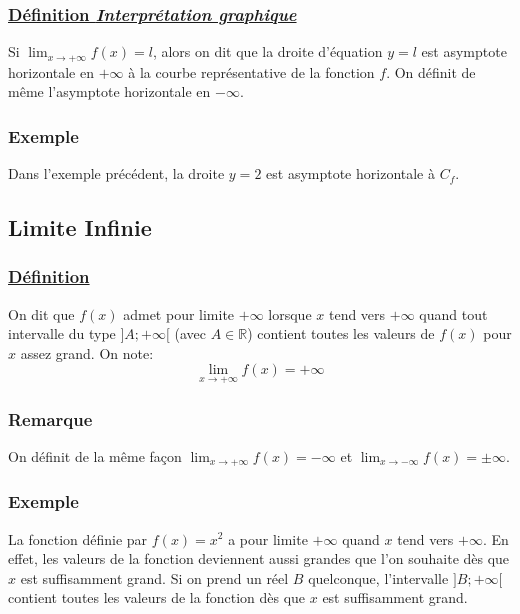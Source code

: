 \documentclass[9pt,twoside]{article}
\begin{document}
\subsubsection*{\underline{Définition \textit{Interprétation graphique}}}

Si $\lim_{x \to +\infty} f(x)=l$, alors on dit que la droite d'équation $y=l$ est asymptote horizontale en $+\infty$ à la courbe représentative de la fonction $f$. On définit de même l'asymptote horizontale en $-\infty$.

\subsubsection*{Exemple}

Dans l'exemple précédent, la droite $y=2$ est asymptote horizontale à $C_f$.

\subsection{Limite Infinie}

\subsubsection*{\underline{Définition}}

On dit que $f(x)$ admet pour limite $+\infty$ lorsque $x$ tend vers $+\infty$ quand tout intervalle du type $]A;+\infty[$ (avec $A \in \mathbb{R}$) contient toutes les valeurs de $f(x)$ pour $x$ assez grand. On note: $$\lim_{x \to +\infty} f(x) = +\infty$$

\subsubsection*{Remarque}

On définit de la même façon $\lim_{x \to +\infty}f(x)=-\infty$ et $\lim_{x \to -\infty}f(x)=\pm\infty$.

\subsubsection*{Exemple}

La fonction définie par $f(x)=x^2$ a pour limite $+\infty$ quand $x$ tend vers $+\infty$. En effet, les valeurs de la fonction deviennent aussi grandes que l'on souhaite dès que $x$ est suffisamment grand. Si on prend un réel $B$ quelconque, l'intervalle $]B;+\infty[$ contient toutes les valeurs de la fonction dès que $x$ est suffisamment grand.
\end{document}
